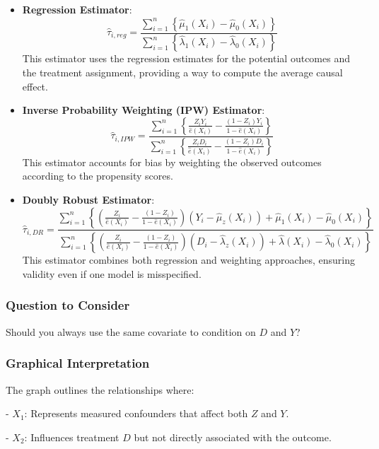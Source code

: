 \begin{itemize}
    \item \textbf{Regression Estimator}:
    \[
\hat{\tau}_{i, reg} = \frac{\sum_{i=1}^{n} \left\{ \hat{\mu}_1(X_i) - \hat{\mu}_0(X_i) \right\}}{\sum_{i=1}^{n} \left\{ \hat{\lambda}_1(X_i) - \hat{\lambda}_0(X_i) \right\}}
\]
    This estimator uses the regression estimates for the potential outcomes and the treatment assignment, providing a way to compute the average causal effect.

    \item \textbf{Inverse Probability Weighting (IPW) Estimator}:
    \[
\hat{\tau}_{i, IPW} = \frac{\sum_{i=1}^{n} \left\{ \frac{Z_i Y_i}{\hat{e}(X_i)} - \frac{(1-Z_i) Y_i}{1 - \hat{e}(X_i)} \right\}}{\sum_{i=1}^{n} \left\{ \frac{Z_i D_i}{\hat{e}(X_i)} - \frac{(1-Z_i) D_i}{1 - \hat{e}(X_i)} \right\}}
\]
    This estimator accounts for bias by weighting the observed outcomes according to the propensity scores.

    \item \textbf{Doubly Robust Estimator}:
  \[
\hat{\tau}_{i, DR} = \frac{\sum_{i=1}^{n} \left\{ \left( \frac{Z_i}{\hat{e}(X_i)} - \frac{(1-Z_i)}{1 - \hat{e}(X_i)} \right) \left( Y_i - \hat{\mu}_z(X_i) \right) + \hat{\mu}_1(X_i) - \hat{\mu}_0(X_i) \right\}}{\sum_{i=1}^{n} \left\{ \left( \frac{Z_i}{\hat{e}(X_i)} - \frac{(1-Z_i)}{1 - \hat{e}(X_i)} \right) \left( D_i - \hat{\lambda}_z(X_i) \right) + \hat{\lambda}(X_i) - \hat{\lambda}_0(X_i) \right\}}
\]
    This estimator combines both regression and weighting approaches, ensuring validity even if one model is misspecified.
\end{itemize}


\subsubsection{Question to Consider}


Should you always use the same covariate to condition on \(D\) and \(Y\)?


\subsubsection{Graphical Interpretation}

The graph outlines the relationships where:

- \(X_1\): Represents measured confounders that affect both \(Z\) and \(Y\).

- \(X_2\): Influences treatment \(D\) but not directly associated with the outcome.


